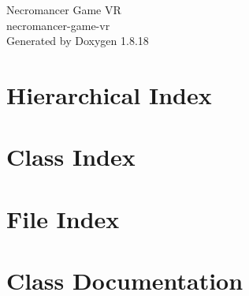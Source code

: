 \let\mypdfximage\pdfximage\def\pdfximage{\immediate\mypdfximage}\documentclass[twoside]{book}
\newcommand{\+}{\discretionary{\mbox{\scriptsize$\hookleftarrow$}}{}{}}
\newcommand{\clearemptydoublepage}{%
  \newpage{\pagestyle{empty}\cleardoublepage}%
}
\begin{document}
\hypersetup{pageanchor=false,
             bookmarksnumbered=true,
             pdfencoding=unicode
            }
\begin{titlepage}
\vspace*{7cm}
\begin{center}%
{\Large Necromancer Game VR \\[1ex]\large necromancer-\/game-\/vr }\\
\vspace*{1cm}
{\large Generated by Doxygen 1.8.18}\\
\end{center}
\end{titlepage}
\clearemptydoublepage
{}
\tableofcontents
\clearemptydoublepage
{}
\hypersetup{pageanchor=true}

\chapter{Hierarchical Index}

\chapter{Class Index}

\chapter{File Index}

\chapter{Class Documentation}



















































\end{document}
